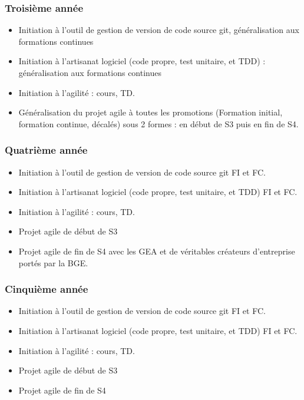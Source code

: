 \documentclass[a4paper]{article}
\begin{document}
\subsubsection{Troisième année}
\begin{itemize}
  \item Initiation à l'outil de gestion de version de code source git, généralisation aux formations continues
  \item Initiation à l'artisanat logiciel (code propre, test unitaire, et TDD) : généralisation aux formations continues
  \item Initiation à l'agilité : cours, TD.
  \item Généralisation du projet agile à toutes les promotions (Formation initial, formation continue, décalés) sous 2 formes : en début de S3 puis en fin de S4.
\end{itemize}

\subsubsection{Quatrième année}
\begin{itemize}
  \item Initiation à l'outil de gestion de version de code source git FI et FC.
  \item Initiation à l'artisanat logiciel (code propre, test unitaire, et TDD) FI et FC.
  \item Initiation à l'agilité : cours, TD.
  \item Projet agile de début de S3
  \item Projet agile de fin de S4 avec les GEA et de véritables créateurs d'entreprise portés par la BGE.
\end{itemize}

\subsubsection{Cinquième année}
\begin{itemize}
  \item Initiation à l'outil de gestion de version de code source git FI et FC.
  \item Initiation à l'artisanat logiciel (code propre, test unitaire, et TDD) FI et FC.
  \item Initiation à l'agilité : cours, TD.
  \item Projet agile de début de S3
  \item Projet agile de fin de S4
\end{itemize}
\end{document}
